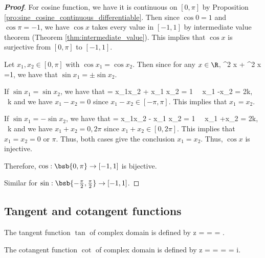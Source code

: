 \begin{proof}[\bf Proof]
For cosine function, we have it is continuous on $[0,\pi]$ by Proposition \ref{pro:sine_cosine_continuous_differentiable}. Then since $\cos 0 = 1$ and $\cos \pi = -1$, we have $\cos x$ takes every value in $[-1,1]$ by intermediate value theorem (Theorem \ref{thm:intermediate_value}). This implies that $\cos x$ is surjective from $[0,\pi]$ to $[-1,1]$.

Let $x_1,x_2\in [0,\pi]$ with $\cos x_1 = \cos x_2$. Then since for any $x\in \R$,
\be
\cos^2 x + \sin^2 x =1,
\ee
we have that $\sin x_1 = \pm \sin x_2$.

If $\sin x_1 = \sin x_2$, we have that
\be
\cos{} = \cos x_1\cos x_2 + \sin x_1 \sin x_2 = 1 \ \ra\ x_1 -x_2 = 2k\pi, \ k\in \N
\ee
and we have $x_1-x_2 = 0$ since $x_1-x_2\in [-\pi,\pi]$. This implies that $x_1=x_2$.

If $\sin x_1 = -\sin x_2$, we have that
\be
\cos{} = \cos x_1\cos x_2 - \sin x_1 \sin x_2 = 1 \ \ra\ x_1 +x_2 = 2k\pi, \ k\in \N
\ee
and we have $x_1+x_2 = 0,2\pi$ since $x_1+x_2\in [0,2\pi]$. This implies that $x_1=x_2=0$ or $\pi$. Thus, both cases give the conclusion $x_1=x_2$. Thus, $\cos x$ is injective.

Therefore, $\cos:\bsb{0,\pi}\to [-1,1]$ is bijective.

Similar for $\sin:\bsb{-\frac{\pi}2,\frac{\pi}2}\to [-1,1]$.
\end{proof}

\subsection{Tangent and cotangent functions}

\begin{definition}
The tangent function $\tan$ of complex domain is defined by
\be
\tan z =  =  = .
\ee

The cotangent function $\cot$ of complex domain is defined by
\be
\cot z =  =   =  = i.
\ee
\end{definition}

